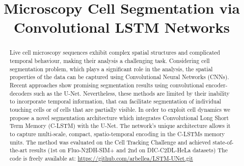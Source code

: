 \documentclass{article}
\begin{document}
\title{Microscopy Cell Segmentation via Convolutional LSTM Networks}



\address{The Department of Electrical and Computer Engineering \\ The Zlotowski Center for Neuroscience\\ Ben-Gurion University of the Negev \\ } 
\maketitle
\begin{abstract}
Live cell microscopy sequences exhibit complex spatial structures and complicated temporal behaviour, making  their analysis a challenging task. Considering cell segmentation problem, which plays a significant role in the analysis, the spatial properties of the data can be captured using Convolutional Neural Networks (CNNs). Recent approaches show promising segmentation results using convolutional encoder-decoders such as the U-Net. Nevertheless,  these methods are limited by their inability to incorporate temporal information, that can facilitate segmentation of individual touching cells or of cells that are partially visible. In order to exploit cell dynamics we propose a novel segmentation architecture which integrates Convolutional Long Short Term Memory (C-LSTM) with the U-Net. The network's unique architecture allows it to capture multi-scale, compact, spatio-temporal encoding in the C-LSTMs memory units. The method was evaluated on the Cell Tracking Challenge and achieved state-of-the-art results (1st on Fluo-N2DH-SIM+ and 2nd on DIC-C2DL-HeLa datasets)
The code is freely available at: \url{https://github.com/arbellea/LSTM-UNet.git}

\end{abstract}
\end{document}
